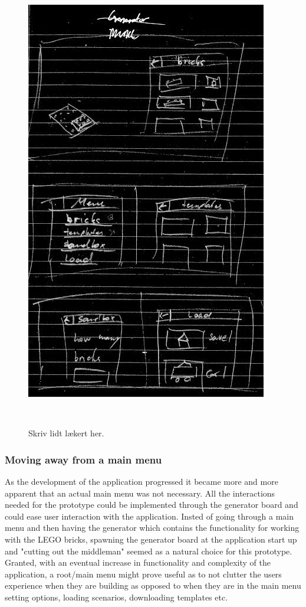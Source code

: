 \begin{figure}
\centering
  \includegraphics[width=0.6\columnwidth]{figures/Menu/menu1.png}
  \caption{Skriv lidt lækert her. }~\label{fig:genboard}
\end{figure}

\subsubsection{Moving away from a main menu}
As the development of the application progressed it became more and more apparent that an actual main menu was not necessary. All the interactions needed for the prototype could be implemented through the generator board and could ease user interaction with the application. Insted of going through a main menu and then having the generator which contains the functionality for working with the LEGO bricks, spawning the generator board at the application start up and "cutting out the middleman" seemed as a natural choice for this prototype. Granted, with an eventual increase in functionality and complexity of the application, a root/main menu might prove useful as to not clutter the users experience when they are building as opposed to when they are in the main menu setting options, loading scenarios, downloading templates etc.